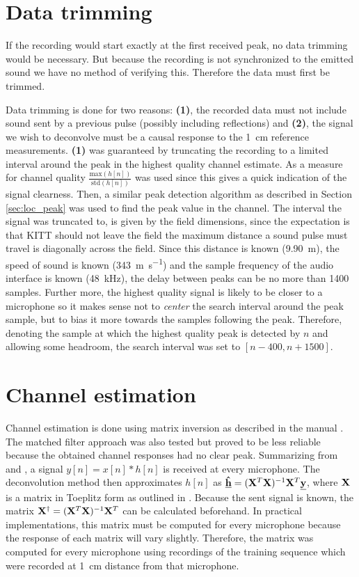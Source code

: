 \documentclass[11pt,titlepage]{report}
\begin{document}
\section{Data trimming}
\label{sec:loc_data_trim}
If the recording would start exactly at the first received peak, no data trimming would be necessary. But because the recording is not synchronized to the emitted sound we have no method of verifying this. Therefore the data must first be trimmed.

Data trimming is done for two reasons: \textbf{(1)}, the recorded data must not include sound sent by a previous pulse (possibly including reflections) and \textbf{(2)}, the signal we wish to deconvolve must be a causal response to the \SI{1}{\centi\meter} reference measurements. \textbf{(1)} was guaranteed by truncating the recording to a limited interval around the peak in the highest quality channel estimate. As a measure for channel quality $\frac{\text{max}(h[n])}{\text{std}(h[n])}$ was used since this gives a quick indication of the signal clearness. Then, a similar peak detection algorithm as described in Section \ref{sec:loc_peak} was used to find the peak value in the channel. The interval the signal was truncated to, is given by the field dimensions, since the expectation is that KITT should not leave the field the maximum distance a sound pulse must travel is diagonally across the field. Since this distance is known (\SI{9.90}{\meter}), the speed of sound is known (\SI{343}{\meter\per\second}) and the sample frequency of the audio interface is known (\SI{48}{\kilo\hertz}), the delay between peaks can be no more than \num{1400} samples. Further more, the highest quality signal is likely to be closer to a microphone so it makes sense not to \textit{center} the search interval around the peak sample, but to bias it more towards the samples following the peak. Therefore, denoting the sample at which the highest quality peak is detected by $n$ and allowing some headroom, the search interval was set to $[n - 400, n + 1500]$.

\section{Channel estimation}
\label{sec:loc_est_h}
Channel estimation is done using matrix inversion as described in the manual \cite{epo4-manual}. The matched filter approach was also tested but proved to be less reliable because the obtained channel responses had no clear peak. Summarizing from \cite{epo4-manual} and \cite{epo4-del7}, a signal $y[n]=x[n]*h[n]$ is received at every microphone. The deconvolution method then approximates $h[n]$ as $\mathbf{\underline{\hat{h}}}=(\mathbf{X}^T\mathbf{X})^{-1}\mathbf{X}^T\mathbf{\underline{y}}$, where $\mathbf{X}$ is a matrix in Toeplitz form as outlined in \cite{epo4-manual}. Because the sent signal is known, the matrix $\mathbf{X}^\dagger=(\mathbf{X}^T\mathbf{X})^{-1}\mathbf{X}^T$ can be calculated beforehand. In practical implementations, this matrix must be computed for every microphone because the response of each matrix will vary slightly. Therefore, the matrix was computed for every microphone using recordings of the training sequence which were recorded at \SI{1}{cm} distance from that microphone.
\end{document}
